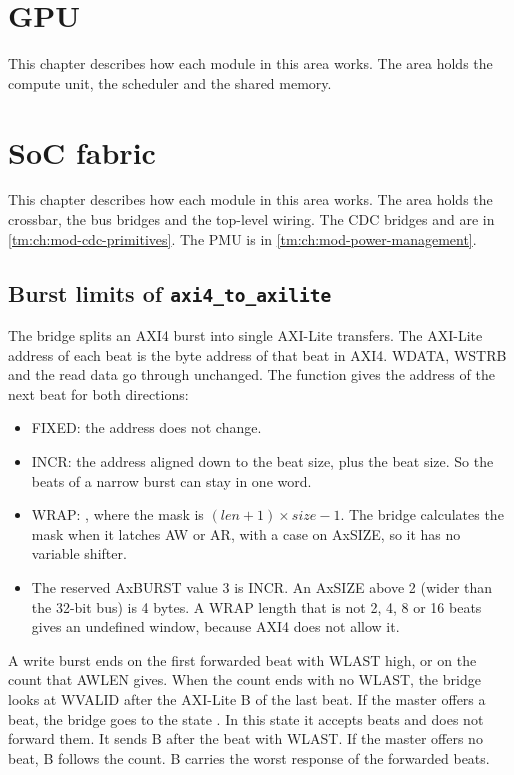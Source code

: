 \chapter{GPU}\label{tm:ch:mod-gpu}

This chapter describes how each module in this area works. The area holds the compute unit, the scheduler and the shared memory.

\chapter{SoC fabric}\label{tm:ch:mod-soc-fabric}

This chapter describes how each module in this area works. The area holds the crossbar, the bus bridges and the top-level wiring. The CDC bridges  and  are in \cref{tm:ch:mod-cdc-primitives}. The PMU is in \cref{tm:ch:mod-power-management}.

\section{Burst limits of \texttt{axi4\_to\_axilite}}\label{tm:mod:axi4-to-axilite}

The bridge  splits an AXI4 burst into single AXI-Lite transfers. The AXI-Lite address of each beat is the byte address of that beat in AXI4. WDATA, WSTRB and the read data go through unchanged. The function  gives the address of the next beat for both directions:
\begin{itemize}
  \item FIXED: the address does not change.
  \item INCR: the address aligned down to the beat size, plus the beat size. So the beats of a narrow burst can stay in one word.
  \item WRAP: , where the mask is $(\mathit{len}+1) \times \mathit{size} - 1$. The bridge calculates the mask when it latches AW or AR, with a case on AxSIZE, so it has no variable shifter.
  \item The reserved AxBURST value 3 is INCR. An AxSIZE above 2 (wider than the 32-bit bus) is 4 bytes. A WRAP length that is not 2, 4, 8 or 16 beats gives an undefined window, because AXI4 does not allow it.
\end{itemize}
A write burst ends on the first forwarded beat with WLAST high, or on the count that AWLEN gives. When the count ends with no WLAST, the bridge looks at WVALID after the AXI-Lite B of the last beat. If the master offers a beat, the bridge goes to the state . In this state it accepts beats and does not forward them. It sends B after the beat with WLAST. If the master offers no beat, B follows the count. B carries the worst response of the forwarded beats.

